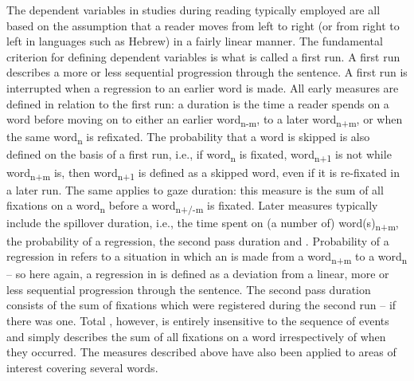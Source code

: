 \documentclass[output=paper]{LSP/langsci}
\begin{document}
The dependent variables in  studies during reading typically employed are all based on the assumption that a reader moves from left to right (or from right to left in languages such as Hebrew) in a fairly linear manner. The fundamental criterion for defining dependent variables is what is called a first run. A first run describes a more or less sequential progression through the sentence. A first run is interrupted when a regression to an earlier word is made. All early  measures are defined in relation to the first run: a  duration is the time a reader spends on a word before moving on to either an earlier word\textsubscript{n-m}, to a later word\textsubscript{n+m}, or when the same word\textsubscript{n} is refixated. The probability that a word is skipped is also defined on the basis of a first run, i.e., if word\textsubscript{n} is fixated, word\textsubscript{n+1} is not while word\textsubscript{n+m} is, then word\textsubscript{n+1} is defined as a skipped word, even if it is re-fixated in a later run. The same applies to gaze duration: this measure is the sum of all fixations on a word\textsubscript{n} before a word\textsubscript{n+/-m} is fixated. Later  measures typically include the spillover duration, i.e., the time spent on (a number of) word(s)\textsubscript{n+m}, the probability of a regression, the second pass duration and . Probability of a regression in refers to a situation in which an  is made from a word\textsubscript{n+m} to a word\textsubscript{n} -- so here again, a regression in is defined as a deviation from a linear, more or less sequential progression through the sentence. The second pass duration consists of the sum of fixations which were registered during the second run -- if there was one. Total , however, is entirely insensitive to the sequence of  events and simply describes the sum of all fixations on a word irrespectively of when they occurred. The measures described above have also been applied to areas of interest covering several words.
\end{document}
